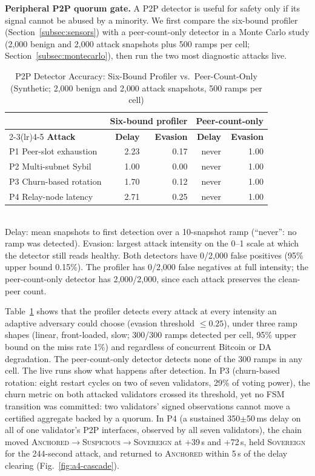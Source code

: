 \textbf{Peripheral P2P quorum gate.} A P2P detector is useful for safety only if its
signal cannot be abused by a minority. We first compare the six-bound
profiler (Section~\ref{subsec:sensors}) with a peer-count-only detector in a
Monte Carlo study (2{,}000 benign and 2{,}000 attack snapshots plus 500
ramps per cell; Section~\ref{subsec:montecarlo}), then run the two most
diagnostic attacks live.

\begin{table}[h]
\caption{P2P Detector Accuracy: Six-Bound Profiler vs.\ Peer-Count-Only
(Synthetic; 2{,}000 benign and 2{,}000 attack snapshots, 500 ramps per cell)}
\label{tab:p2p-detector}
\centering
\footnotesize
\setlength{\tabcolsep}{3pt}
\begin{tabular}{@{}lrrrr@{}}
\toprule
 & \multicolumn{2}{c}{\textbf{Six-bound profiler}} & \multicolumn{2}{c}{\textbf{Peer-count-only}} \\
\cmidrule(lr){2-3}\cmidrule(lr){4-5}
\textbf{Attack} & \textbf{Delay} & \textbf{Evasion} & \textbf{Delay} & \textbf{Evasion} \\
\midrule
P1 Peer-slot exhaustion & 2.23 & 0.17 & never & 1.00 \\
P2 Multi-subnet Sybil & 1.00 & 0.00 & never & 1.00 \\
P3 Churn-based rotation & 1.70 & 0.12 & never & 1.00 \\
P4 Relay-node latency & 2.71 & 0.25 & never & 1.00 \\
\bottomrule
\end{tabular}
\\[2pt]
\footnotesize Delay: mean snapshots to first detection over a 10-snapshot
ramp (``never'': no ramp was detected). Evasion: largest attack intensity on
the 0--1 scale at which the detector still reads healthy. Both detectors have
0/2{,}000 false positives (95\% upper bound 0.15\%). The profiler has 0/2{,}000
false negatives at full intensity; the peer-count-only detector has
2{,}000/2{,}000, since each attack preserves the clean-peer count.
\end{table}

Table~\ref{tab:p2p-detector} shows that the profiler detects every attack
at every intensity an adaptive adversary could choose (evasion threshold
$\leq 0.25$), under three ramp shapes (linear, front-loaded, slow; 300/300
ramps detected per cell, 95\% upper bound on the miss rate 1\%) and
regardless of concurrent Bitcoin or DA degradation. The peer-count-only
detector detects none of the 300 ramps in any cell. The live runs show what happens after detection. In P3
(churn-based rotation: eight restart cycles on two of seven validators,
29\% of voting power), the churn metric on both attacked validators crossed
its threshold, yet no FSM transition was committed: two validators' signed
observations cannot move a certified aggregate backed by a quorum. In P4 (a sustained 350$\pm$50\,ms delay on all of one
validator's P2P interfaces, observed by all seven validators), the chain
moved \textsc{Anchored}$\to$\textsc{Suspicious}$\to$\textsc{Sovereign} at
+39\,s and +72\,s, held \textsc{Sovereign} for the 244-second attack, and
returned to \textsc{Anchored} within 5\,s of the delay clearing
(Fig.~\ref{fig:a4-cascade}).

